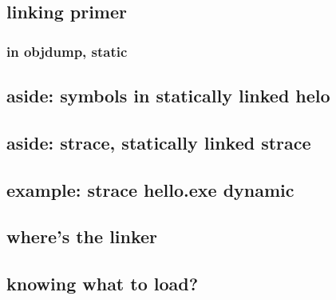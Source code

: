 \subsection{linking primer}


\subsubsection{in objdump, static}


\subsection{aside: symbols in statically linked helo}


\subsection{aside: strace, statically linked strace}


\subsection{example: strace hello.exe dynamic}


\subsection{where's the linker}



\subsection{knowing what to load?}



